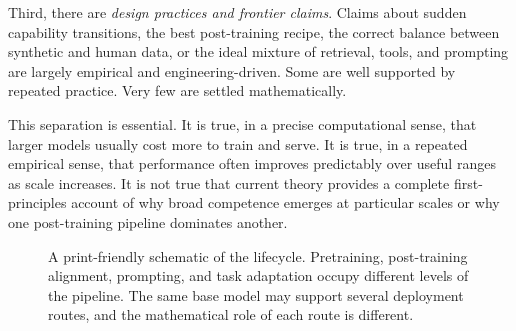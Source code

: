 Third, there are \emph{design practices and frontier claims}.
Claims about sudden capability transitions, the best post-training recipe, the correct balance between synthetic and human data, or the ideal mixture of retrieval, tools, and prompting are largely empirical and engineering-driven.
Some are well supported by repeated practice.
Very few are settled mathematically.

This separation is essential.
It is true, in a precise computational sense, that larger models usually cost more to train and serve.
It is true, in a repeated empirical sense, that performance often improves predictably over useful ranges as scale increases.
It is not true that current theory provides a complete first-principles account of why broad competence emerges at particular scales or why one post-training pipeline dominates another.

\begin{figure}[h]
\centering
{}
\caption{A print-friendly schematic of the lifecycle.
Pretraining, post-training alignment, prompting, and task adaptation occupy different levels of the pipeline.
The same base model may support several deployment routes, and the mathematical role of each route is different.}
\end{figure}

